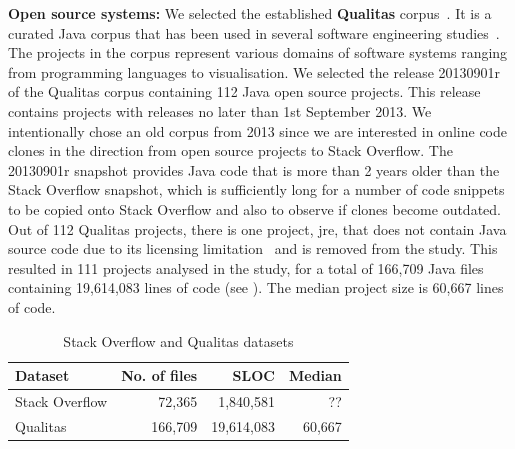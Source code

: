 \documentclass[10pt,journal,compsoc]{IEEEtran}
\begin{document}
\textbf{Open source systems: }
We selected the established \textbf{Qualitas} corpus~\cite{QualitasCorpus}. It is a curated Java corpus that has been used in several
software engineering
studies~\cite{Taube-Schock2011,Beckman2011,Vasilescu2011,Omar2012}. The
projects in the corpus represent various domains of software systems
ranging from programming languages to
visualisation. We selected the release 20130901r
of the Qualitas corpus containing 112 Java open source projects. This
release contains projects with releases no later than 1st September
2013. We intentionally chose an old corpus from 2013 since we are interested in
online code clones in the direction from open source projects to Stack
Overflow. The 20130901r snapshot provides Java code that is more than
2 years older than the Stack Overflow snapshot, which is sufficiently
long for a number of code snippets to be copied onto Stack Overflow
and also to observe if clones become outdated. Out of 112 Qualitas
projects, there is one project, \textsf{jre}, that does not contain
Java source code due to its licensing limitation~\cite{QualitasCorpus}
and is removed from the study. This resulted in 111
projects analysed in the study, for a total of 166,709 Java files containing 19,614,083
lines of code (see ). The median project size is 60,667 lines of code.

\begin{table}
	\centering
	\caption{Stack Overflow and Qualitas datasets}
	\label{tab:datasets}
	\begin{tabular}{lrrr}
		\toprule
		Dataset & No. of files & SLOC & Median \\
		\midrule
		Stack Overflow & 72,365 & 1,840,581 & ?? \\ 
		Qualitas &  166,709 & 19,614,083 & 60,667 \\ 
		\bottomrule
	\end{tabular} 
\end{table}
\end{document}
